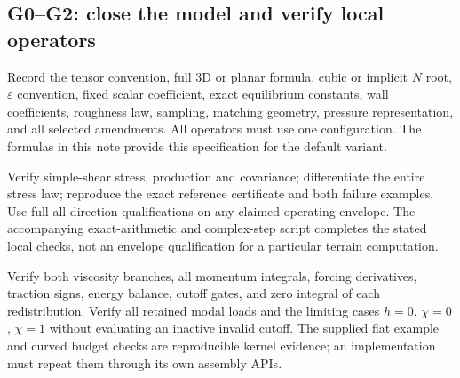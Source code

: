 \documentclass[11pt,a4paper]{article}
\numberwithin{equation}{section}
\newcommand{\eps}{\varepsilon}
\begin{document}
\subsection{G0--G2: close the model and verify local operators}
\begin{description}[style=nextline,leftmargin=2.6em]
\item[G0: operator specification.]
Record the tensor convention, full 3D or planar formula, cubic or
implicit $N$ root, $\eps$ convention, fixed scalar coefficient, exact
equilibrium constants, wall coefficients, roughness law, sampling,
matching geometry, pressure representation, and all selected amendments.
All operators must use one configuration. The formulas in this note
provide this specification for the default variant.
\item[G1: constitutive checks.]
Verify simple-shear stress, production and covariance; differentiate
the entire stress law; reproduce the exact reference certificate and
both failure examples. Use full all-direction qualifications on any
claimed operating envelope. The accompanying exact-arithmetic and
complex-step script completes the stated local checks, not an envelope
qualification for a particular terrain computation.
\item[G2: scalar wall kernels.]
Verify both viscosity branches, all momentum integrals, forcing
derivatives, traction signs, energy balance, cutoff gates, and zero
integral of each redistribution. Verify all retained modal loads and
the limiting cases $h=0$, $\chi=0$, $\chi=1$ without evaluating an
inactive invalid cutoff. The supplied flat example and curved budget
checks are reproducible kernel evidence; an implementation must repeat
them through its own assembly APIs.
\end{description}
\end{document}
